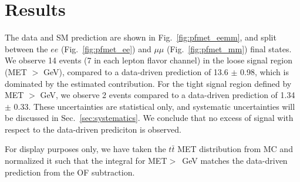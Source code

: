 
\section{Results}
\label{sec:results}

The data and SM prediction are shown in Fig.~\ref{fig:pfmet_eemm}, 
and split between the $ee$ (Fig.~\ref{fig:pfmet_ee})
and $\mu\mu$ (Fig.~\ref{fig:pfmet_mm}) final states. 
We observe 14 events (7 in each lepton flavor channel) 
in the loose signal region (MET $>$ \signalmetl GeV), 
compared to a data-driven prediction of 
13.6 $\pm$ 0.98,
which is dominated by the estimated \ttbar contribution. 
For the tight signal region defined by MET $>$ \signalmett GeV, 
we observe 2 events compared to a 
data-driven prediction of 
1.34 $\pm$ 0.33.
These uncertainties are statistical only, and systematic uncertainties will be 
discussed in Sec.~\ref{sec:systematics}. We conclude that no excess of signal 
with respect to the data-driven prediciton is observed.

For display purposes only, we have taken the
$t\bar{t}$ MET distribution from MC and normalized it such that the integral for 
MET$>$\signalmetl~GeV matches the data-driven prediction
from the OF subtraction. 



